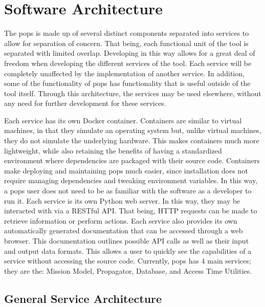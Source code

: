 \glsresetall{} 

\chapter{Software Architecture}\label{chap:architecture}

\lettrine[lines=2, findent=0pt, nindent=5pt]{T}{}he \gls{pops} is made up of
several distinct components separated into services to allow for separation of
concern. That being, each functional unit of the tool is separated with limited
overlap. Developing in this way allows for a great deal of freedom when
developing the different services of the tool. Each service will be completely
unaffected by the implementation of another service. In addition, some of the
functionality of \gls{pops} has functionality that is useful outside of the
tool itself. Through this architecture, the services may be used elsewhere,
without any need for further development for these services.  

Each service has its own Docker container. Containers are similar to virtual
machines, in that they simulate an operating system but, unlike virtual
machines, they do not simulate the underlying hardware. This makes containers
much more lightweight, while also retaining the benefits of having a
standardized environment where dependencies are packaged with their source
code. Containers make deploying and maintaining \gls{pops} much easier, since
installation does not require managing dependencies and tweaking environment
variables. In this way, a \gls{pops} user does not need to be as familiar with
the software as a developer to run it.  Each service is its own Python web
server. In this way, they may be interacted with via a RESTful API. That being,
HTTP requests can be made to retrieve information or perform actions. Each
service also provides its own automatically generated documentation that can be
accessed through a web browser. This documentation outlines possible API calls
as well as their input and output data formats.  This allows a user to quickly
see the capabilities of a service without accessing the source code. Currently,
\gls{pops} has 4 main services; they are the: Mission Model, Propagator,
Database, and Access Time Utilities.


\section{General Service Architecture}

